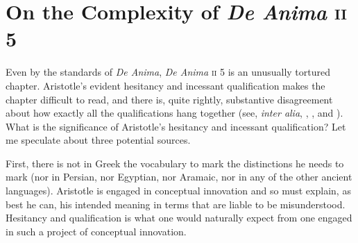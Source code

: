 
\section{On the Complexity of \emph{De Anima} \textsc{ii} 5} %
\label{sec:on_the_complexity_of_de anima_ii_5}

Even by the standards of \emph{De Anima}, \emph{De Anima} \textsc{ii} 5 is an unusually tortured chapter. Aristotle's evident hesitancy and incessant qualification makes the chapter difficult to read, and there is, quite rightly, substantive disagreement about how exactly all the qualifications hang together (see, \emph{inter alia}, \citealt{Burnyeat:2002an}, \citealt{Heinaman:2007ys}, and \citealt{Bowin:2011uq}). What is the significance of Aristotle's hesitancy and incessant qualification? Let me speculate about three potential sources. 

First, there is not in Greek the vocabulary to mark the distinctions he needs to mark (nor in Persian, nor Egyptian, nor Aramaic, nor in any of the other ancient languages). Aristotle is engaged in conceptual innovation and so must explain, as best he can, his intended meaning in terms that are liable to be misunderstood. Hesitancy and qualification is what one would naturally expect from one engaged in such a project of conceptual innovation. 

